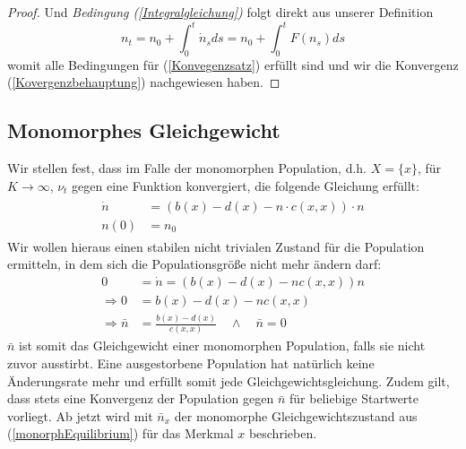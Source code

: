 \documentclass[11pt, a4paper, german]{article}
\theoremstyle{plain}
\begin{document}
\begin{proof}
		Und \textit{Bedingung (\ref{Integralgleichung})} folgt direkt aus unserer Definition
		\[ n_t = n_0 + \int_{0}^{t} \dot{n}_s ds = n_0 + \int_{0}^{t} F(n_s) ds \]
		womit alle Bedingungen für (\ref{Konvegenzsatz}) erfüllt sind und wir die Konvergenz (\ref{Kovergenzbehauptung}) nachgewiesen haben.
	\end{proof}
	
	\subsection{Monomorphes Gleichgewicht}
	Wir stellen fest, dass im Falle der monomorphen Population, d.h. $ X = \{x\} $, für $ K \to \infty $, $ \nu_t $ gegen eine Funktion konvergiert, die folgende Gleichung erfüllt:
	\begin{align}
	\begin{split}
		\dot{n} &= (b(x) - d(x) - n \cdot c(x,x)) \cdot n \\
		n(0) &= n_0
	\end{split}
	\end{align}
	Wir wollen hieraus einen stabilen nicht trivialen Zustand für die Population ermitteln, in dem sich die Populationsgröße nicht mehr ändern darf:
	\begin{align}
		0 &= \dot{n} = (b(x) - d(x) - nc(x,x))n \nonumber\\
		\Rightarrow 0 &= b(x) - d(x) - nc(x,x) \nonumber\\
		\Rightarrow \bar{n} &= \frac{b(x) - d(x)}{c(x,x)} \quad \wedge \quad \bar{n} = 0 \label{monorphEquilibrium}
	\end{align}
	$ \bar{n} $ ist somit das Gleichgewicht einer monomorphen Population, falls sie nicht zuvor ausstirbt. Eine ausgestorbene Population hat natürlich keine Änder\-ungsrate mehr und erfüllt somit jede Gleichgewichtsgleichung. Zudem gilt, dass stets eine Konvergenz der Population gegen $ \bar{n} $ für beliebige Startwerte vorliegt.
	Ab jetzt wird mit $ \bar{n}_x $ der monomorphe Gleichgewichtszustand aus (\ref{monorphEquilibrium}) für das Merkmal $ x $ beschrieben.
	
\end{document}
